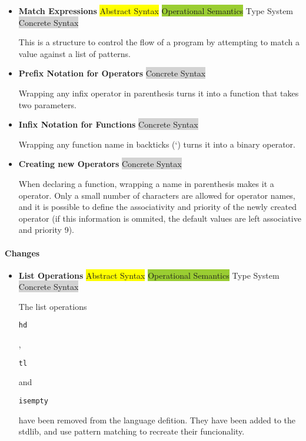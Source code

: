 \documentclass{article}
\def\code#1{\begin{footnotesize}\texttt{#1}\end{footnotesize}}
\begin{document}
\begin{itemize}
  \item \textbf{Match Expressions} \; \; {\small\colorbox{yellow}{Abstract Syntax} \colorbox{YellowGreen}{Operational Semantics} \colorbox{ProcessBlue}{Type System} \colorbox{lightgray}{Concrete Syntax}}

      This is a structure to control the flow of a program by attempting to match a value against a list of patterns.

  \item \textbf{Prefix Notation for Operators} \; \; {\small\colorbox{lightgray}{Concrete Syntax}}

      Wrapping any infix operator in parenthesis turns it into a function that takes two parameters.

  \item \textbf{Infix Notation for Functions} \; \; {\small\colorbox{lightgray}{Concrete Syntax}}

      Wrapping any function name in backticks (\lq) turns it into a binary operator.

  \item \textbf{Creating new Operators} \; \; {\small\colorbox{lightgray}{Concrete Syntax}}

      When declaring a function, wrapping a name in parenthesis makes it a operator.
      Only a small number of characters are allowed for operator names, and it is possible to define the associativity and priority of the newly created operator (if this information is ommited, the default values are left associative and priority 9).

\end{itemize}

\paragraph{Changes}

\begin{itemize}
  \item \textbf{List Operations} \; \; {\small\colorbox{yellow}{Abstract Syntax} \colorbox{YellowGreen}{Operational Semantics} \colorbox{ProcessBlue}{Type System} \colorbox{lightgray}{Concrete Syntax}}

      The list operations \code{hd}, \code{tl} and \code{isempty} have been removed from the language defition.
      They have been added to the stdlib, and use pattern matching to recreate their funcionality.
\end{itemize}
\end{document}
